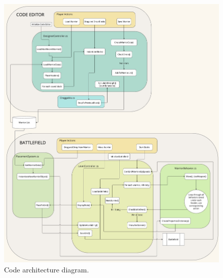 \documentclass[10pt,twocolumn]{article}
\begin{document}
\begin{figure}
    \centering
    \includegraphics[width=\linewidth]{images/architecture-diagram.jpg}
    \caption{Code architecture diagram.}
    \label{fig:architecture-diagram}
\end{figure}
\end{document}
